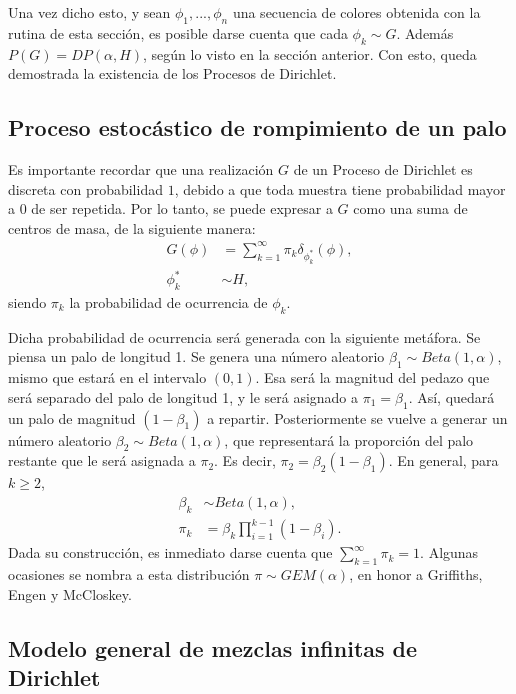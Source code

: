 Una vez dicho esto, y sean $\phi_1,...,\phi_n$ una secuencia de colores obtenida con la rutina de esta secci\'on, es posible darse cuenta que cada $\phi_k \sim G$. Adem\'as $P(G) = DP(\alpha,H)$, seg\'un lo visto en la secci\'on anterior. Con esto, queda demostrada la existencia de los Procesos de Dirichlet.

\subsection{Proceso estoc\'astico de rompimiento de un palo}
Es importante recordar que una realizaci\'on $G$ de un Proceso de Dirichlet es discreta con probabilidad $1$, debido a que toda muestra tiene probabilidad mayor a $0$ de ser repetida. Por lo tanto, se puede expresar a $G$ como una suma de centros de masa, de la siguiente manera:
\begin{equation*}
\begin{aligned}
G(\phi) &= \sum_{k=1}^\infty \pi_k \delta_{\phi_k^*}(\phi),\\
   \phi_k^* &\sim H,
\end{aligned}
\end{equation*}
siendo $\pi_k$ la probabilidad de ocurrencia de $\phi_k$.

Dicha probabilidad de ocurrencia ser\'a generada con la siguiente met\'afora. Se piensa un palo de longitud 1. Se genera una n\'umero aleatorio $\beta_1 \sim Beta(1,\alpha)$, mismo que estar\'a en el intervalo $(0,1)$. Esa ser\'a la magnitud del pedazo que ser\'a separado del palo de longitud 1, y le ser\'a asignado a $\pi_1 = \beta_1$. As\'i, quedar\'a un palo de magnitud $(1-\beta_1)$ a repartir. Posteriormente se vuelve a generar un n\'umero aleatorio $\beta_2 \sim Beta(1,\alpha)$, que representar\'a la proporci\'on del palo restante que le ser\'a asignada a $\pi_2$. Es decir, $\pi_2 = \beta_2(1-\beta_1)$. En general, para $k \geq 2$,
\begin{equation*}
\begin{aligned}
   \beta_k &\sim Beta(1,\alpha),\\
   \pi_k &= \beta_k \prod_{i=1}^{k-1}(1 - \beta_i).
\end{aligned}
\end{equation*}
Dada su construcci\'on, es inmediato darse cuenta que $\sum_{k=1}^\infty \pi_k = 1$. Algunas ocasiones se nombra a esta distribuci\'on $\pi \sim GEM(\alpha)$, en honor a Griffiths, Engen y McCloskey.

\subsection{Modelo general de mezclas infinitas de Dirichlet}

